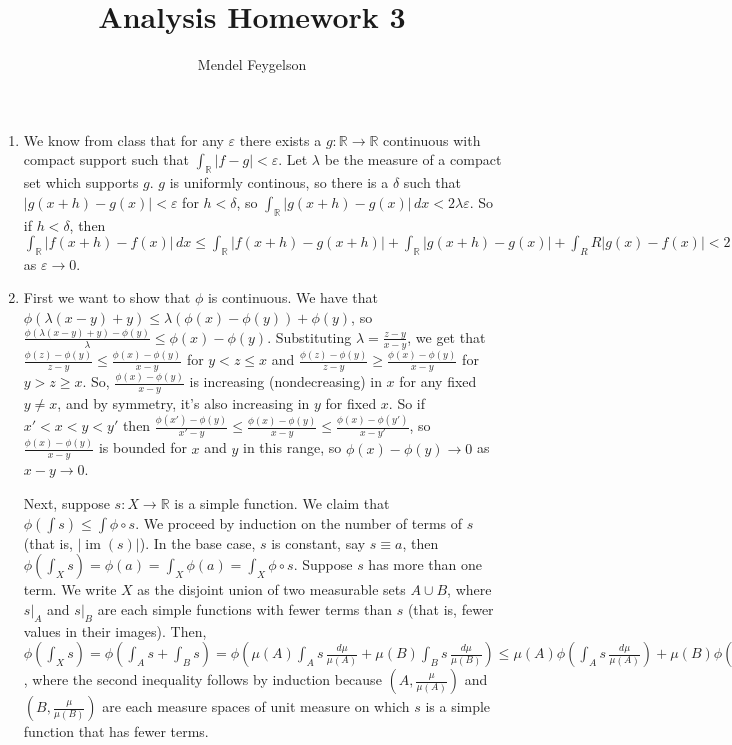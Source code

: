 \documentclass{article}
\title{Analysis Homework 3}
\author{Mendel Feygelson}
\newcommand\RR{\mathbb R}
\DeclareMathOperator\im{im}
\begin{document}
\maketitle
\begin{enumerate}

  \item We know from class that for any $\varepsilon$ there exists a $g : \RR
     \to \RR$ continuous with compact support such that $\int_\RR |f-g| <
     \varepsilon$. Let $\lambda$ be the measure of a compact set which supports
     $g$. $g$ is uniformly continous, so there is a $\delta$ such that
     $|g(x+h)-g(x)|<\varepsilon$ for $h < \delta$, so $\int_\RR
     |g(x+h)-g(x)|\,dx < 2\lambda\varepsilon$. So if $h<\delta$, then $\int_\RR
     |f(x+h)-f(x)|\,dx \leq \int_\RR |f(x+h)-g(x+h)| + \int_\RR |g(x+h)-g(x)| +
     \int_RR |g(x)-f(x)| < 2(\lambda+1)\varepsilon \to 0$ as $\varepsilon \to
     0$.

  \item First we want to show that $\phi$ is continuous. We have that
     $\phi(\lambda(x-y)+y) \leq \lambda(\phi(x)-\phi(y)) + \phi(y)$, so
     $\frac{\phi(\lambda(x-y)+y)-\phi(y)}\lambda \leq \phi(x)-\phi(y)$.
     Substituting $\lambda=\frac{z-y}{x-y}$, we get that
     $\frac{\phi(z)-\phi(y)}{z-y} \leq \frac{\phi(x)-\phi(y)}{x-y}$ for
     $y < z \leq x$ and $\frac{\phi(z)-\phi(y)}{z-y} \geq
     \frac{\phi(x)-\phi(y)}{x-y}$ for $y > z \geq x$. So,
     $\frac{\phi(x)-\phi(y)}{x-y}$ is increasing (nondecreasing) in $x$ for any
     fixed $y \neq x$, and by symmetry, it's also increasing in $y$ for fixed
     $x$. So if $x'<x<y<y'$ then $\frac{\phi(x')-\phi(y)}{x'-y} \leq
     \frac{\phi(x)-\phi(y)}{x-y} \leq \frac{\phi(x)-\phi(y')}{x-y'}$, so
     $\frac{\phi(x)-\phi(y)}{x-y}$ is bounded for $x$ and $y$ in this range, so
     $\phi(x)-\phi(y) \to 0$ as $x-y \to 0$.

     Next, suppose $s : X \to \RR$ is a simple function. We claim that
     $\phi(\int s) \leq \int \phi \circ s$. We proceed by induction on the
     number of terms of $s$ (that is, $|\im(s)|$). In the base case, $s$ is
     constant, say $s \equiv a$, then $\phi(\int_X s) = \phi(a) = \int_X \phi(a)
     = \int_X \phi \circ s$. Suppose $s$ has more than one term. We write $X$ as
     the disjoint union of two measurable sets $A \cup B$, where $s|_A$ and
     $s|_B$ are each simple functions with fewer terms than $s$ (that is, fewer
     values in their images). Then, $\phi(\int_X s) = \phi(\int_A s + \int_B s)
     = \phi\left(\mu(A) \int_A s \, \frac{d\mu}{\mu(A)} + \mu(B) \int_B s \,
     \frac{d\mu}{\mu(B)}\right) \leq \mu(A)\phi\left(\int_A s\,
     \frac{d\mu}{\mu(A)}\right) + \mu(B)\phi\left(\int_B s\,
     \frac{d\mu}{\mu(B)}\right) \leq \mu(A)\int_A (\phi \circ s) \,
     \frac{d\mu}{\mu(A)} + \mu(B)\int_B (\phi \circ s) \, \frac{d\mu}{\mu(B)} =
     \int_X \phi \circ s$, where the second inequality follows by induction
     because $(A,\frac\mu{\mu(A)})$ and $(B,\frac\mu{\mu(B)})$ are each measure
     spaces of unit measure on which $s$ is a simple function that has fewer
     terms.


\end{enumerate}
\end{document}
